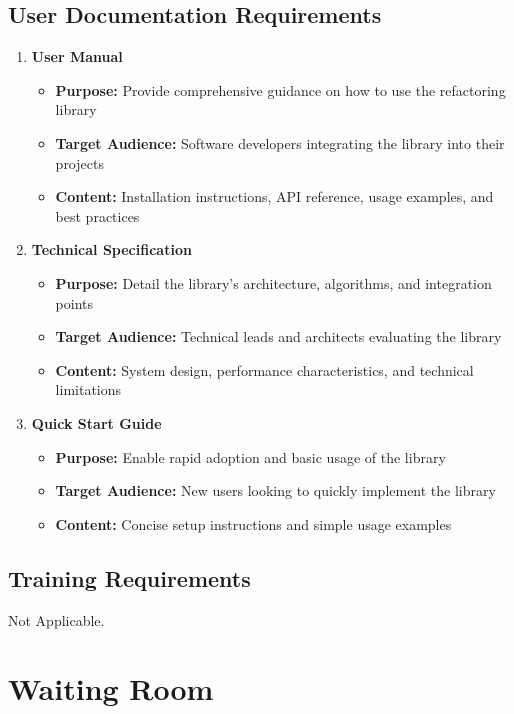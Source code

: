 \documentclass[12pt]{article}
\begin{document}
\subsection{User Documentation Requirements}
\begin{enumerate}
  \item \textbf{User Manual}
  \begin{itemize}
      \item \textbf{Purpose:} Provide comprehensive guidance on how to use the refactoring library
      \item \textbf{Target Audience:} Software developers integrating the library into their projects
      \item \textbf{Content:} Installation instructions, API reference, usage examples, and best practices
  \end{itemize}

  \item \textbf{Technical Specification}
  \begin{itemize}
      \item \textbf{Purpose:} Detail the library's architecture, algorithms, and integration points
      \item \textbf{Target Audience:} Technical leads and architects evaluating the library
      \item \textbf{Content:} System design, performance characteristics, and technical limitations
  \end{itemize}

  \item \textbf{Quick Start Guide}
  \begin{itemize}
      \item \textbf{Purpose:} Enable rapid adoption and basic usage of the library
      \item \textbf{Target Audience:} New users looking to quickly implement the library
      \item \textbf{Content:} Concise setup instructions and simple usage examples
  \end{itemize}
\end{enumerate}

\subsection{Training Requirements}
Not Applicable.

\section{Waiting Room}
\end{document}
